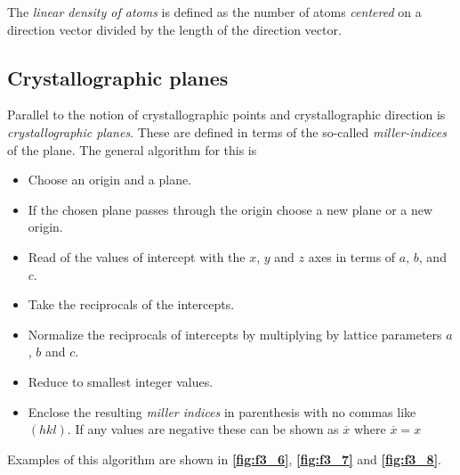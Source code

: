 \begin{definition}
  The \textit{linear density of atoms} is defined as the number of atoms \textit{centered} on a direction vector divided by the length of the direction vector.
\end{definition}

\subsection{Crystallographic planes}
Parallel to the notion of crystallographic points and crystallographic direction is \textit{crystallographic planes}. These are defined in terms of the so-called \textit{miller-indices} of the plane. The general algorithm for this is
\begin{itemize}
  \item Choose an origin and a plane.
  \item If the chosen plane passes through the origin choose a new plane or a new origin.
  \item Read of the values of intercept with the $x$, $y$ and $z$ axes in terms of $a$, $b$, and $c$.
  \item Take the reciprocals of the intercepts.
  \item Normalize the reciprocals of intercepts by multiplying by lattice parameters $a$, $b$ and $c$.
  \item Reduce to smallest integer values.
  \item Enclose the resulting \textit{miller indices} in parenthesis with no commas like $(hkl)$. If any values are negative these can be shown as $\overline{x}$ where $\overline{x} = x$
\end{itemize}
Examples of this algorithm are shown in \textbf{\autoref{fig:f3_6}}, \textbf{\autoref{fig:f3_7}} and \textbf{\autoref{fig:f3_8}}.
